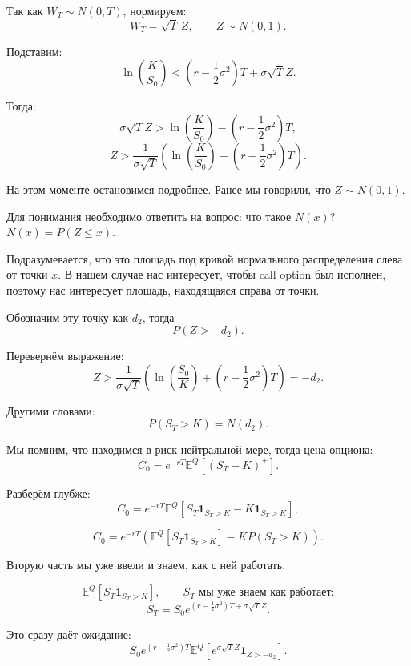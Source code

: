\documentclass[12pt]{article}
\begin{document}
Так как $W_T\sim N(0,T)$, нормируем:
\[
W_T=\sqrt{T}\,Z, \qquad Z\sim N(0,1).
\]

Подставим:
\[
\ln\left(\frac{K}{S_0}\right)
<
\left(r - \frac12\sigma^2\right)T + \sigma\sqrt{T}Z.
\]

Тогда:
\[
\sigma\sqrt{T}Z >
\ln\left(\frac{K}{S_0}\right)
-
\left(r - \frac12\sigma^2\right)T,
\]
\[
Z >
\frac{1}{\sigma\sqrt{T}}
\left(
\ln\left(\frac{K}{S_0}\right)
-
\left(r - \frac12\sigma^2\right)T
\right).
\]

На этом моменте остановимся подробнее.
Ранее мы говорили, что $Z\sim N(0,1)$.

Для понимания необходимо ответить на вопрос:
что такое $N(x)$? $N(x)=P(Z\le x)$.

Подразумевается, что это площадь под кривой нормального распределения
слева от точки $x$. В нашем случае нас интересует,
чтобы call option был исполнен, поэтому нас интересует площадь,
находящаяся справа от точки.

Обозначим эту точку как $d_2$, тогда
\[
P(Z>-d_2).
\]

Перевернём выражение:
\[
Z >
\frac{1}{\sigma\sqrt{T}}
\left(
\ln\left(\frac{S_0}{K}\right)
+
\left(r - \frac12\sigma^2\right)T
\right)
= -d_2.
\]

Другими словами:
\begin{equation}
P(S_T>K)=N(d_2).
\end{equation}

Мы помним, что находимся в риск-нейтральной мере,
тогда цена опциона:
\begin{equation}
C_0=e^{-rT}\mathbb{E}^Q[(S_T-K)^+].
\end{equation}

Разберём глубже:
\begin{equation}
C_0=e^{-rT}\mathbb{E}^Q[S_T\mathbf{1}_{S_T>K}-K\mathbf{1}_{S_T>K}],
\end{equation}

\begin{equation}
C_0=e^{-rT}
\left(
\mathbb{E}^Q[S_T\mathbf{1}_{S_T>K}]
-
K P(S_T>K)
\right).
\end{equation}

Вторую часть мы уже ввели и знаем,
как с ней работать.

\[
\mathbb{E}^Q[S_T\mathbf{1}_{S_T>K}],\qquad
S_T \text{ мы уже знаем как работает:}
\]
\[
S_T=S_0 e^{(r-\frac12\sigma^2)T+\sigma\sqrt{T}Z}.
\]

Это сразу даёт ожидание:
\[
S_0 e^{(r-\frac12\sigma^2)T}
\mathbb{E}^Q\left[e^{\sigma\sqrt{T}Z}\mathbf{1}_{Z>-d_2}\right].
\]
\end{document}
